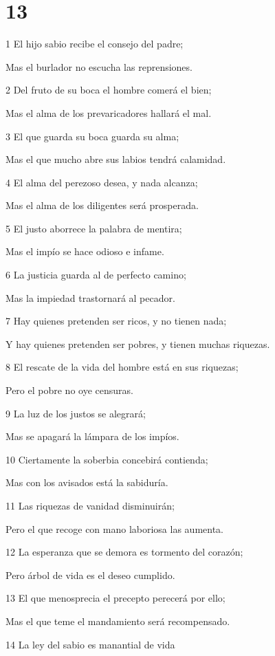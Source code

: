 \chapter{13}

\par 1 El hijo sabio recibe el consejo del padre;
\par Mas el burlador no escucha las reprensiones.
\par 2 Del fruto de su boca el hombre comerá el bien;
\par Mas el alma de los prevaricadores hallará el mal.
\par 3 El que guarda su boca guarda su alma;
\par Mas el que mucho abre sus labios tendrá calamidad.
\par 4 El alma del perezoso desea, y nada alcanza;
\par Mas el alma de los diligentes será prosperada.
\par 5 El justo aborrece la palabra de mentira;
\par Mas el impío se hace odioso e infame.
\par 6 La justicia guarda al de perfecto camino;
\par Mas la impiedad trastornará al pecador.
\par 7 Hay quienes pretenden ser ricos, y no tienen nada;
\par Y hay quienes pretenden ser pobres, y tienen muchas riquezas.
\par 8 El rescate de la vida del hombre está en sus riquezas;
\par Pero el pobre no oye censuras.
\par 9 La luz de los justos se alegrará;
\par Mas se apagará la lámpara de los impíos.
\par 10 Ciertamente la soberbia concebirá contienda;
\par Mas con los avisados está la sabiduría.
\par 11 Las riquezas de vanidad disminuirán;
\par Pero el que recoge con mano laboriosa las aumenta.
\par 12 La esperanza que se demora es tormento del corazón;
\par Pero árbol de vida es el deseo cumplido.
\par 13 El que menosprecia el precepto perecerá por ello;
\par Mas el que teme el mandamiento será recompensado.
\par 14 La ley del sabio es manantial de vida
